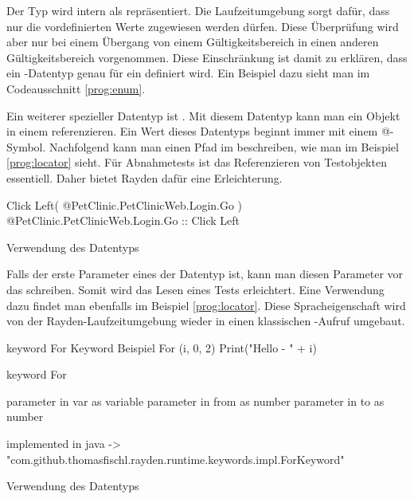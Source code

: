 \SuperPar
Der Typ  wird intern als  repräsentiert. Die Laufzeitumgebung sorgt dafür, dass nur die vordefinierten Werte zugewiesen werden dürfen. Diese Überprüfung wird aber nur bei einem Übergang von einem Gültigkeitsbereich in einen anderen Gültigkeitsbereich vorgenommen. Diese Einschränkung ist damit zu erklären, dass ein -Datentyp genau für ein  definiert wird. Ein Beispiel dazu sieht man im Codeausschnitt \ref{prog:enum}.  

\SuperPar
Ein weiterer spezieller Datentyp ist . Mit diesem Datentyp kann man ein Objekt in einem  referenzieren. Ein Wert dieses Datentyps beginnt immer mit einem @-Symbol. Nachfolgend kann man einen Pfad im  beschreiben, wie man im Beispiel \ref{prog:locator} sieht. Für Abnahmetests ist das Referenzieren von Testobjekten essentiell. Daher bietet Rayden dafür eine Erleichterung. 

\begin{program}
\begin{JavaCode}
Click Left( @PetClinic.PetClinicWeb.Login.Go )
@PetClinic.PetClinicWeb.Login.Go :: Click Left
\end{JavaCode}
\caption{Verwendung des Datentyps }
\label{prog:locator}
\end{program}

\SuperPar
Falls der erste Parameter eines  der Datentyp  ist, kann man diesen Parameter vor das  schreiben. Somit wird das Lesen eines Tests erleichtert. Eine Verwendung dazu findet man ebenfalls im Beispiel \ref{prog:locator}. Diese Spracheigenschaft wird von der Rayden-Laufzeitumgebung wieder in einen klassischen -Aufruf umgebaut.

\begin{program}
\begin{JavaCode}
keyword For Keyword Beispiel {
	For (i, 0, 2) {
		Print("Hello - " + i)
	}
}

keyword For { 
	parameter in var as variable
	parameter in from as number
	parameter in to as number

	implemented in java -> "com.github.thomasfischl.rayden.runtime.keywords.impl.ForKeyword"
}
\end{JavaCode}
\caption{Verwendung des Datentyps }
\label{prog:variable}
\end{program}


